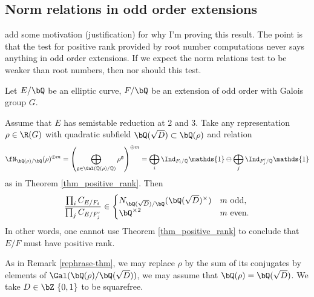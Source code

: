 \subsection{Norm relations in odd order extensions}

{\color{red} add some motivation (justification) for why I'm proving this result. The point is that the test for positive rank provided by root number computations never says anything in odd order extensions. If we expect the norm relations test to be weaker than root numbers, then nor should this test.}

\begin{thm}\label{odd-exts}
 Let $E / \bQ$ be an elliptic curve, $F / \bQ$ be an extension of odd order with Galois group $G$. 
 
Assume that $E$ has semistable reduction at $2$ and $3$. 
Take any representation $\rho \in \R(G)$ with quadratic subfield $\bQ(\sqrt{D}) \subset \bQ(\rho)$ and relation
\begin{equation*}\label{odd-exp} \repnorm{\rho}^{\oplus m} =
 \left(\bigoplus_{\mathfrak{g}\in\Gal(\QQ(\rho)/\QQ)}\rho^{\mathfrak{g}}\right)^{\oplus m }=\bigoplus_i\Ind_{F_i/\QQ}\mathds{1}\ominus\bigoplus_j\Ind_{F'_j/\QQ}\mathds{1}
\end{equation*}
 as in Theorem \ref{thm_positive_rank}. Then
 \[ \frac{\prod_i C_{E/F_i}}{\prod_j C_{E/F_j'}}  \in 
    \begin{cases}
        N_{\bQ(\sqrt{D}) / \bQ}(\bQ(\sqrt{D})^{\times}) & m \ \text{odd}, \\
        \bQ^{\times 2} & m \ \text{even}.
    \end{cases} \] 
    In other words, one cannot use Theorem \ref{thm_positive_rank} to conclude that $E / F$ must have positive rank. 
\end{thm}

As in Remark \ref{rephrase-thm}, we may replace $\rho$ by the sum of its conjugates by elements of $ \Gal(\bQ(\rho) / \bQ(\sqrt{D}))$, we may assume that $\bQ(\rho) = \bQ(\sqrt{D})$. We take $D \in \bZ \ \{0,1 \}$ to be squarefree.

